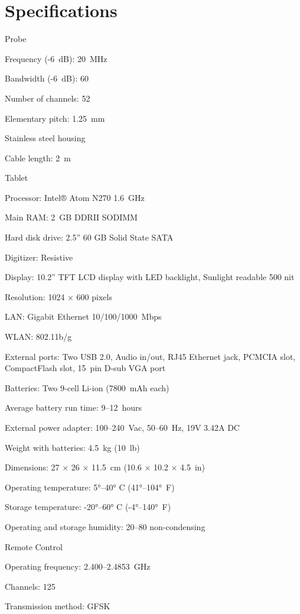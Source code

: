 \chapter[specifications]{Specifications}

Probe

\startitemize
\item
Frequency (-6 dB): 20 MHz
\item
Bandwidth (-6 dB): 60
\item
Number of channels: 52
\item
Elementary pitch: 1.25 mm
\item
Stainless steel housing
\item
Cable length: 2 m
\stopitemize

Tablet

\startitemize
\item
Processor: Intel® Atom N270 1.6 GHz
\item
Main RAM: 2 GB DDRII SODIMM
\item
Hard disk drive: 2.5” 60 GB Solid State SATA
\item
Digitizer: Resistive
\item
Display: 10.2” TFT LCD display with LED backlight, Sunlight readable 500 nit
\item
Resolution: 1024 × 600 pixels
\item
LAN: Gigabit Ethernet 10/100/1000 Mbps
\item
WLAN: 802.11b/g
\item
External ports: Two USB 2.0, Audio in/out, RJ45 Ethernet jack, PCMCIA slot, CompactFlash slot, 15 pin D-sub VGA port
\item
Batteries: Two 9-cell Li-ion (7800 mAh each)
\item
Average battery run time: 9–12 hours
\item
External power adapter: 100–240 Vac, 50–60 Hz, 19V 3.42A DC
\item
Weight with batteries: 4.5 kg (10 lb)
\item
Dimensions: 27 × 26 × 11.5 cm (10.6 × 10.2 × 4.5 in)
\item
Operating temperature: 5°–40° C (41°–104° F)
\item
Storage temperature: -20°–60° C (-4°–140° F)
\item
Operating and storage humidity: 20–80 non-condensing
\stopitemize

Remote Control

\startitemize
\item
Operating frequency: 2.400–2.4853 GHz
\item
Channels: 125
\item
Transmission method: GFSK
\stopitemize